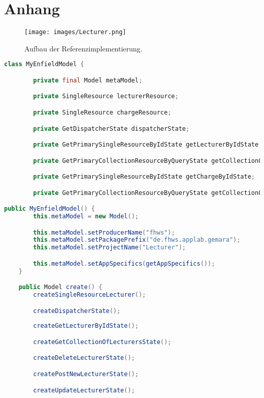 \chapter{Anhang}

\newpage
\begin{figure}[H]
	\begin{center}
		\texttt{[image: images/Lecturer.png]}
		\caption*{Aufbau der Referenzimplementierung.}
		\label{fig:lecturer_structure}
	\end{center}
\end{figure}

\newpage

\begin{lstlisting}[label=lst:enfield_model,
language=java,
firstnumber=1,
caption=Beschreibung des \textit{Enfield-Modell} der Referenzimplementierung. ]
class MyEnfieldModel {

		private final Model metaModel;

		private SingleResource lecturerResource;

		private SingleResource chargeResource;

		private GetDispatcherState dispatcherState;

		private GetPrimarySingleResourceByIdState getLecturerByIdState;

		private GetPrimaryCollectionResourceByQueryState getCollectionOfLecturersState;

		private GetPrimarySingleResourceByIdState getChargeByIdState;

		private GetPrimaryCollectionResourceByQueryState getCollectionOfChargesState;

public MyEnfieldModel() {
		this.metaModel = new Model();

		this.metaModel.setProducerName("fhws");
		this.metaModel.setPackagePrefix("de.fhws.applab.gemara");
		this.metaModel.setProjectName("Lecturer");

		this.metaModel.setAppSpecifics(getAppSpecifics());
	}

	public Model create() {
		createSingleResourceLecturer();

		createDispatcherState();
	
		createGetLecturerByIdState();

		createGetCollectionOfLecturersState();

		createDeleteLecturerState();

		createPostNewLecturerState();

		createUpdateLecturerState();


\end{lstlisting}

